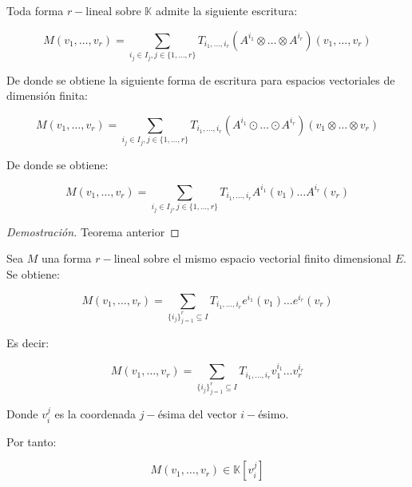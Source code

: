 \begin{prop}
	Toda forma $r-$lineal sobre $\mathbb{K}$ admite la siguiente escritura:
	
	\begin{equation*}
		M(v_1,\dots,v_r) = \sum_{i_j \in I_j, j \in \{1,\dots,r \}} T_{i_1,\dots, i_r}(A^{i_1} \otimes \dots \otimes A^{i_r}) (v_1,\dots,v_r)
	\end{equation*}
	
	De donde se obtiene la siguiente forma de escritura para espacios vectoriales de dimensión finita:
	
	\begin{equation*}
		M(v_1,\dots,v_r) = \sum_{i_j \in I_j, j \in \{1,\dots,r \}} T_{i_1,\dots, i_r}(A^{i_1} \odot \dots \odot A^{i_r}) (v_1\otimes\dots \otimes v_r)
	\end{equation*}
	
	De donde se obtiene:
	
	\begin{equation*}
		M(v_1,\dots,v_r) = \sum_{i_j \in I_j, j \in \{1,\dots,r \}} T_{i_1,\dots, i_r}A^{i_1}(v_1) \dots  A^{i_r}(v_r)
	\end{equation*}
\end{prop}

\begin{proof}[Demostración]
	Teorema anterior
\end{proof}

\begin{cor}
	Sea $M$ una forma $r-$lineal sobre el mismo espacio vectorial finito dimensional $E$. Se obtiene:
	
	\begin{equation*}
		M(v_1,\dots,v_r) = \sum_{\{i_j\}_{j = 1}^r \subseteq I} T_{i_1,\dots, i_r}e^{i_1}(v_1) \dots  e^{i_r}(v_r)
	\end{equation*}
	
	Es decir:
	
	\begin{equation*}
		M(v_1,\dots,v_r) = \sum_{\{i_j\}_{j = 1}^r \subseteq I} T_{i_1,\dots, i_r}v_1^{i_1} \dots  v_r^{i_r}
	\end{equation*} 
	
	Donde $v_i^j$ es la coordenada $j-$ésima del vector $i-$ésimo.
	
	Por tanto:
	
	\begin{equation*}
		M(v_1,\dots,v_r) \in \mathbb{K}[v_i^j]
	\end{equation*}
	
\end{cor}

